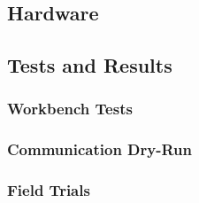 \lipsum

\subsection{Hardware}
\label{sec:Integration_Hardware}

\lipsum

\subsection{Tests and Results}
\label{sec:Integration_TestingWorkbench}

\subsubsection{Workbench Tests}

\lipsum

\subsubsection{Communication Dry-Run}

\lipsum

\subsubsection{Field Trials}

\lipsum


